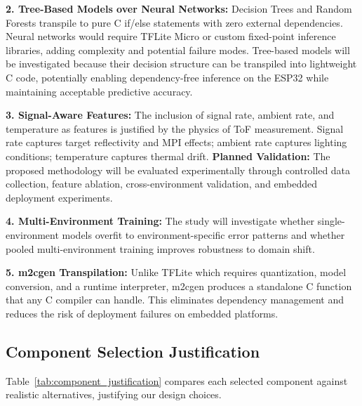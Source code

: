 \documentclass[12pt,a4paper]{article}
\begin{document}
    \textbf{2. Tree-Based Models over Neural Networks:} Decision Trees and Random Forests transpile to pure C if/else statements with zero external dependencies. Neural networks would require TFLite Micro or custom fixed-point inference libraries, adding complexity and potential failure modes. Tree-based models will be investigated because their decision structure can be transpiled into lightweight C code, potentially enabling dependency-free inference on the ESP32 while maintaining acceptable predictive accuracy.

    \textbf{3. Signal-Aware Features:} The inclusion of signal rate, ambient rate, and temperature as features is justified by the physics of ToF measurement. Signal rate captures target reflectivity and MPI effects; ambient rate captures lighting conditions; temperature captures thermal drift. 
    \textbf{Planned Validation:} The proposed methodology will be evaluated experimentally through controlled data collection, feature ablation, cross-environment validation, and embedded deployment experiments.

    \textbf{4. Multi-Environment Training:} The study will investigate whether single-environment models overfit to environment-specific error patterns and whether pooled multi-environment training improves robustness to domain shift.

    \textbf{5. m2cgen Transpilation:} Unlike TFLite which requires quantization, model conversion, and a runtime interpreter, m2cgen produces a standalone C function that any C compiler can handle. This eliminates dependency management and reduces the risk of deployment failures on embedded platforms.

    \subsection{Component Selection Justification}

    Table~\ref{tab:component_justification} compares each selected component against realistic alternatives, justifying our design choices.
\end{document}
